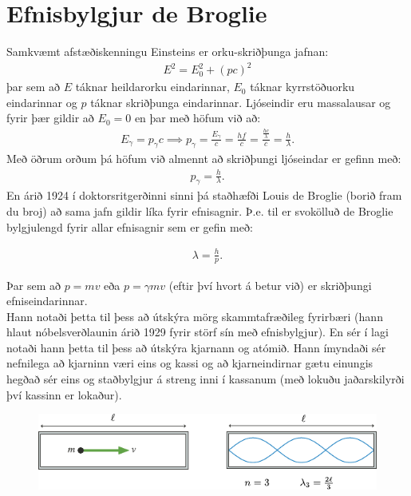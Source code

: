\ifdefined \wholebook \else\documentclass[oneside]{book}\usepackage{EdlBook}\graphicspath{{figures/}}
\begin{document}
\section{Efnisbylgjur de Broglie}

Samkvæmt afstæðiskenningu Einsteins er orku-skriðþunga jafnan:
\begin{align*}
    E^2 = E_0^2 + (pc)^2
\end{align*}
þar sem að $E$ táknar heildarorku eindarinnar, $E_0$ táknar kyrrstöðuorku eindarinnar og $p$ táknar skriðþunga eindarinnar. Ljóseindir eru massalausar og fyrir þær gildir að $E_0 = 0$ en þar með höfum við að:
\begin{align*}
    E_\gamma = p_\gamma c \implies p_\gamma = \frac{E_\gamma}{c} = \frac{hf}{c} = \frac{\frac{hc}{\lambda}}{c} = \frac{h}{\lambda}.
\end{align*}
Með öðrum orðum þá höfum við almennt að skriðþungi ljóseindar er gefinn með:
\begin{align*}
    p_\gamma = \frac{h}{\lambda}.
\end{align*}
En árið 1924 í doktorsritgerðinni sinni þá staðhæfði Louis de Broglie (borið fram du broj) að sama jafn gildir líka fyrir efnisagnir. Þ.e. til er svokölluð de Broglie bylgjulengd fyrir allar efnisagnir sem er gefin með:
\begin{tcolorbox}
\begin{align*}
    \lambda = \frac{h}{p}.
\end{align*}
\end{tcolorbox}
Þar sem að $p = mv$ eða $p = \gamma mv$ (eftir því hvort á betur við) er skriðþungi efniseindarinnar. \\

Hann notaði þetta til þess að útskýra mörg skammtafræðileg fyrirbæri (hann hlaut nóbelsverðlaunin árið 1929 fyrir störf sín með efnisbylgjur). En sér í lagi notaði hann þetta til þess að útskýra kjarnann og atómið. Hann ímyndaði sér nefnilega að kjarninn væri eins og kassi og að kjarneindirnar gætu einungis hegðað sér eins og staðbylgjur á streng inni í kassanum (með lokuðu jaðarskilyrði því kassinn er lokaður).

\begin{figure}[H]
    \centering
    \includegraphics{figures/stadbylgja.pdf}
\end{figure}
\end{document}
